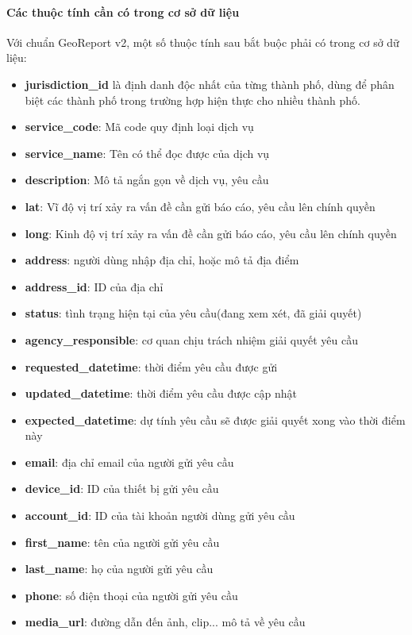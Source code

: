 \documentclass[a4paper]{article}
\begin{document}
\paragraph*{Các thuộc tính cần có trong cơ sở dữ liệu}
Với chuẩn GeoReport v2, một số thuộc tính sau bắt buộc phải có trong cơ sở dữ liệu:
\begin{itemize}
	\item \textbf{jurisdiction\_id} là định danh độc nhất của từng thành phố, dùng để phân biệt các thành phố trong trường hợp hiện thực cho nhiều thành phố.
	\item \textbf{service\_code}: Mã code quy định loại dịch vụ
	\item \textbf{service\_name}: Tên có thể đọc được của dịch vụ
	\item \textbf{description}: Mô tả ngắn gọn về dịch vụ, yêu cầu
	\item \textbf{lat}: Vĩ độ vị trí xảy ra vấn đề cần gửi báo cáo, yêu cầu lên chính quyền
	\item \textbf{long}: Kinh độ vị trí xảy ra vấn đề cần gửi báo cáo, yêu cầu lên chính quyền
	\item \textbf{address}: người dùng nhập địa chỉ, hoặc mô tả địa điểm
	\item \textbf{address\_id}: ID của địa chỉ
	\item \textbf{status}: tình trạng hiện tại của yêu cầu(đang xem xét, đã giải quyết)
	\item \textbf{agency\_responsible}: cơ quan chịu trách nhiệm giải quyết yêu cầu
	\item \textbf{requested\_datetime}: thời điểm yêu cầu được gửi
	\item \textbf{updated\_datetime}: thời điểm yêu cầu được cập nhật
	\item \textbf{expected\_datetime}: dự tính yêu cầu sẽ được giải quyết xong vào thời điểm này
	\item \textbf{email}: địa chỉ email của người gửi yêu cầu
	\item \textbf{device\_id}: ID của thiết bị gửi yêu cầu
	\item \textbf{account\_id}: ID của tài khoản người dùng gửi yêu cầu
	\item \textbf{first\_name}: tên của người gửi yêu cầu
	\item \textbf{last\_name}: họ của người gửi yêu cầu
	\item \textbf{phone}: số điện thoại của người gửi yêu cầu
	\item \textbf{media\_url}: đường dẫn đến ảnh, clip... mô tả về yêu cầu
\end{itemize}
\end{document}
